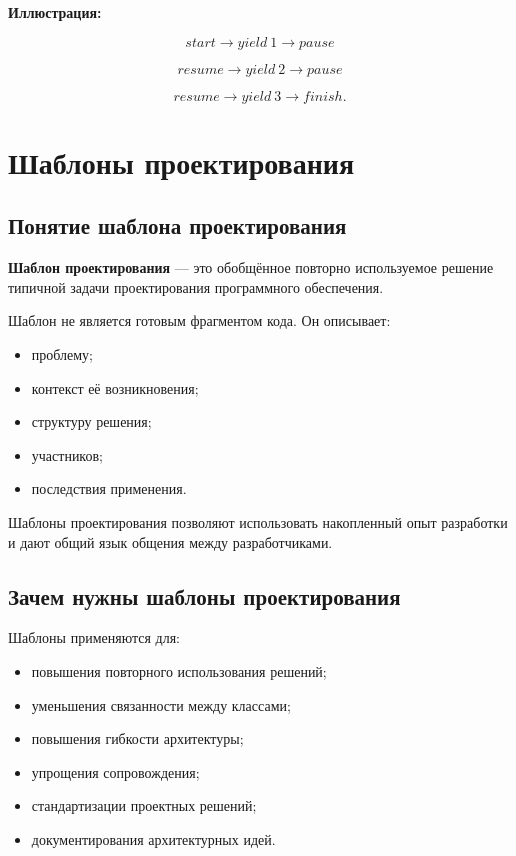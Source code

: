 \documentclass[12pt,a4paper]{article}
\begin{document}
\textbf{Иллюстрация:}

\[
start \rightarrow yield\ 1 \rightarrow pause
\]

\[
resume \rightarrow yield\ 2 \rightarrow pause
\]

\[
resume \rightarrow yield\ 3 \rightarrow finish.
\]

\section{Шаблоны проектирования}

\subsection{Понятие шаблона проектирования}

\textbf{Шаблон проектирования} --- это обобщённое повторно используемое решение типичной задачи проектирования программного обеспечения.

Шаблон не является готовым фрагментом кода. Он описывает:
\begin{itemize}
    \item проблему;
    \item контекст её возникновения;
    \item структуру решения;
    \item участников;
    \item последствия применения.
\end{itemize}

Шаблоны проектирования позволяют использовать накопленный опыт разработки и дают общий язык общения между разработчиками.

\subsection{Зачем нужны шаблоны проектирования}

Шаблоны применяются для:
\begin{itemize}
    \item повышения повторного использования решений;
    \item уменьшения связанности между классами;
    \item повышения гибкости архитектуры;
    \item упрощения сопровождения;
    \item стандартизации проектных решений;
    \item документирования архитектурных идей.
\end{itemize}
\end{document}
